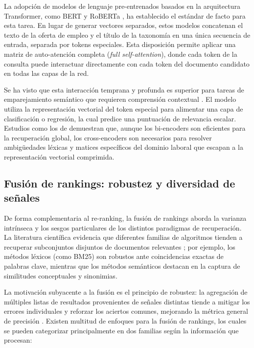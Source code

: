 La adopción de modelos de lenguaje pre-entrenados basados en la arquitectura Transformer, como BERT \cite{devlin2019bert} y RoBERTa \cite{liu2019roberta}, ha establecido el estándar de facto para esta tarea. En lugar de generar vectores separados, estos modelos concatenan el texto de la oferta de empleo y el título de la taxonomía en una única secuencia de entrada, separada por tokens especiales. Esta disposición permite aplicar una matriz de auto-atención completa (\textit{full self-attention}), donde cada token de la consulta puede interactuar directamente con cada token del documento candidato en todas las capas de la red.

Se ha visto que esta interacción temprana y profunda es superior para tareas de emparejamiento semántico que requieren comprensión contextual \cite{lin2022pretrained}. El modelo utiliza la representación vectorial del token especial para alimentar una capa de clasificación o regresión, la cual predice una puntuación de relevancia escalar. Estudios como los de \cite{li2023parade} demuestran que, aunque los bi-encoders son eficientes para la recuperación global, los cross-encoders son necesarios para resolver ambigüedades léxicas y matices específicos del dominio laboral que escapan a la representación vectorial comprimida.

\subsection{Fusión de rankings: robustez y diversidad de señales}

\noindent De forma complementaria al re-ranking, la fusión de rankings aborda la varianza intrínseca y los sesgos particulares de los distintos paradigmas de recuperación. La literatura científica evidencia que diferentes familias de algoritmos tienden a recuperar subconjuntos disjuntos de documentos relevantes \cite{belkin1993effect}; por ejemplo, los métodos léxicos (como \gls{BM25}) son robustos ante coincidencias exactas de palabras clave, mientras que los métodos semánticos destacan en la captura de similitudes conceptuales y sinonimias.

La motivación subyacente a la fusión es el principio de robustez: la agregación de múltiples listas de resultados provenientes de señales distintas tiende a mitigar los errores individuales y reforzar los aciertos comunes, mejorando la métrica general de precisión \cite{fox1994combination}. Existen multitud de enfoques para la fusión de rankings, los cuales se pueden categorizar principalmente en dos familias según la información que procesan:

